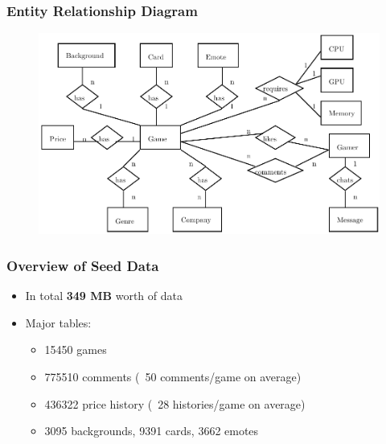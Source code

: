 \begin{frame}
\frametitle{Entity Relationship Diagram}

\begin{figure}
	\includegraphics[scale=0.7]{erd.pdf}
\end{figure}

\end{frame}

\begin{frame}
\frametitle{Overview of Seed Data}
	\begin{itemize}
		\setlength\itemsep{1em}
		\item In total \textbf{349 MB} worth of data
		\item Major tables:
			\begin{itemize}
				\setlength\itemsep{1em}
				\item 15450 games
				\item 775510 comments (~50 comments/game on average)
				\item 436322 price history (~28 histories/game on average)
				\item 3095 backgrounds, 9391 cards, 3662 emotes
			\end{itemize}
	\end{itemize}
\end{frame}
